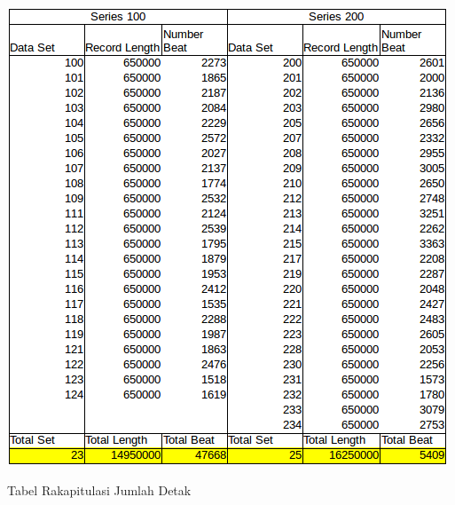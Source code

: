 \begin{table}[H]
	\centering
	\includegraphics[scale=0.7]{images/tabel_data.png}
	\caption{Tabel Rakapitulasi Jumlah Detak}
	\label{tabel:dataset}
\end{table}	

